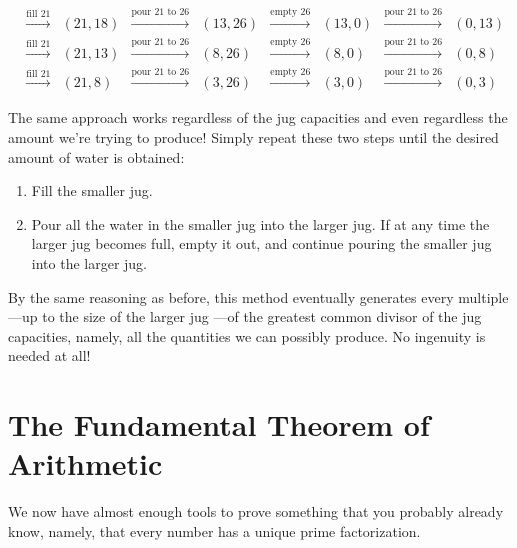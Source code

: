\[\begin{array}{ccccccccc}
& \xrightarrow{\text{fill 21}} & (21,18)& \xrightarrow{\text{pour 21 to 26}} & (13,26)& \xrightarrow{\text{empty 26}} & (13,0)& \xrightarrow{\text{pour 21 to 26}} & (0,13)\\
& \xrightarrow{\text{fill 21}} & (21,13)& \xrightarrow{\text{pour 21 to 26}} & (8,26)& \xrightarrow{\text{empty 26}} & (8,0)& \xrightarrow{\text{pour 21 to 26}} & (0,8)\\
& \xrightarrow{\text{fill 21}} & (21,8)& \xrightarrow{\text{pour 21 to 26}} & (3,26)& \xrightarrow{\text{empty 26}} & (3,0)& \xrightarrow{\text{pour 21 to 26}} & (0,3)
\end{array}
\]

The same approach works regardless of the jug capacities and even
regardless the amount we're trying to produce!  Simply repeat these
two steps until the desired amount of water is obtained:
\begin{enumerate}
\item Fill the smaller jug.

\item Pour all the water in the smaller jug into the larger jug.
If at any time the larger jug becomes full, empty it out, and continue
pouring the smaller jug into the larger jug.
\end{enumerate}
By the same reasoning as before, this method eventually generates
every multiple ---up to the size of the larger jug ---of the greatest
common divisor of the jug capacities, namely, all the quantities we
can possibly produce.  No ingenuity is needed at all!


\begin{problems}

\classproblems
{}

\homeworkproblems
{}

\end{problems}


\section{The Fundamental Theorem of Arithmetic}\label{fundamental_theorem_sec}

We now have almost enough tools to prove something that you probably
already know, namely, that every number has a unique prime
factorization.  

